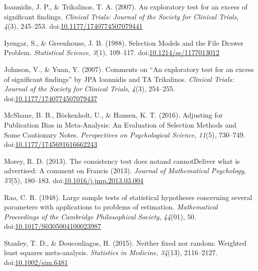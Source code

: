 \documentclass[man,floatsintext]{apa6}
\begin{document}
\leavevmode\hypertarget{ref-ioannidis2007ExploratoryTestExcess}{}%
Ioannidis, J. P., \& Trikalinos, T. A. (2007). An exploratory test for an excess of significant findings. \emph{Clinical Trials: Journal of the Society for Clinical Trials}, \emph{4}(3), 245--253. doi:\href{https://doi.org/10.1177/1740774507079441}{10.1177/1740774507079441}

\leavevmode\hypertarget{ref-iyengar1988SelectionModelsFile}{}%
Iyengar, S., \& Greenhouse, J. B. (1988). Selection Models and the File Drawer Problem. \emph{Statistical Science}, \emph{3}(1), 109--117. doi:\href{https://doi.org/10.1214/ss/1177013012}{10.1214/ss/1177013012}

\leavevmode\hypertarget{ref-johnson2007CommentsExploratoryTest}{}%
Johnson, V., \& Yuan, Y. (2007). Comments on ``An exploratory test for an excess of significant findings'' by JPA loannidis and TA Trikalinos. \emph{Clinical Trials: Journal of the Society for Clinical Trials}, \emph{4}(3), 254--255. doi:\href{https://doi.org/10.1177/1740774507079437}{10.1177/1740774507079437}

\leavevmode\hypertarget{ref-mcshane2016AdjustingPublicationBias}{}%
McShane, B. B., Böckenholt, U., \& Hansen, K. T. (2016). Adjusting for Publication Bias in Meta-Analysis: An Evaluation of Selection Methods and Some Cautionary Notes. \emph{Perspectives on Psychological Science}, \emph{11}(5), 730--749. doi:\href{https://doi.org/10.1177/1745691616662243}{10.1177/1745691616662243}

\leavevmode\hypertarget{ref-morey2013ConsistencyTestDoes}{}%
Morey, R. D. (2013). The consistency test does notand cannotDeliver what is advertised: A comment on Francis (2013). \emph{Journal of Mathematical Psychology}, \emph{57}(5), 180--183. doi:\href{https://doi.org/10.1016/j.jmp.2013.03.004}{10.1016/j.jmp.2013.03.004}

\leavevmode\hypertarget{ref-rao1948LargeSampleTests}{}%
Rao, C. R. (1948). Large sample tests of statistical hypotheses concerning several parameters with applications to problems of estimation. \emph{Mathematical Proceedings of the Cambridge Philosophical Society}, \emph{44}(01), 50. doi:\href{https://doi.org/10.1017/S0305004100023987}{10.1017/S0305004100023987}

\leavevmode\hypertarget{ref-stanley2015NeitherFixedRandom}{}%
Stanley, T. D., \& Doucouliagos, H. (2015). Neither fixed nor random: Weighted least squares meta-analysis. \emph{Statistics in Medicine}, \emph{34}(13), 2116--2127. doi:\href{https://doi.org/10.1002/sim.6481}{10.1002/sim.6481}
\end{document}
